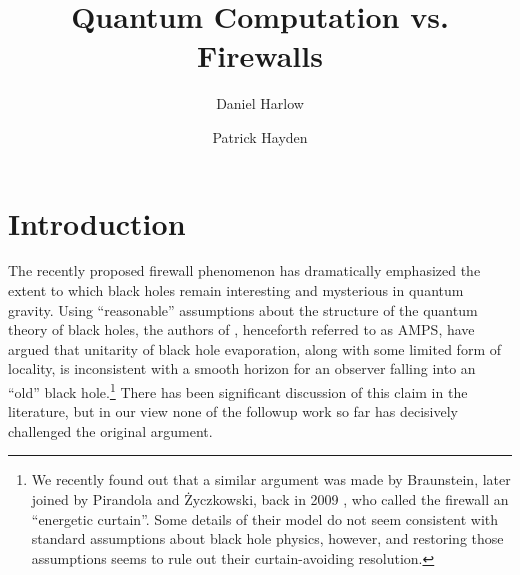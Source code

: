 \documentclass[12pt]{article}
\begin{document}
\title{Quantum Computation vs. Firewalls}
\author[a]{Daniel Harlow}
\author[b]{Patrick Hayden}
\maketitle
\section{Introduction}
The recently proposed firewall phenomenon \cite{Almheiri:2012rt} has dramatically emphasized the extent to which black holes remain interesting and mysterious in quantum gravity.  Using ``reasonable'' assumptions about the structure of the quantum theory of black holes, the authors of \cite{Almheiri:2012rt}, henceforth referred to as AMPS, have argued that unitarity of black hole evaporation, along with some limited form of locality, is inconsistent with a smooth horizon for an observer falling into an ``old'' black hole.\footnote{We recently found out that a similar argument was made by Braunstein, later joined by Pirandola and \.{Z}yczkowski, back in 2009 \cite{Braunstein:2009my}, who called the firewall an ``energetic curtain''.  Some details of their model do not seem consistent with standard assumptions about black hole physics, however, and restoring those assumptions seems to rule out their curtain-avoiding resolution.}  There has been significant discussion of this claim in the literature, but in our view none of the followup work so far has decisively challenged the original argument.  
\end{document}
